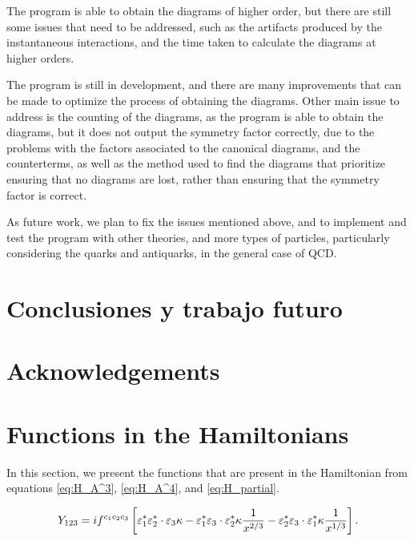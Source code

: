 \documentclass[11pt,a4paper,twoside,pdf]{article}
\numberwithin{equation}{section}
\begin{document}
The program is able to obtain the diagrams of higher order, but there are still
some issues that need to be addressed, such as the artifacts produced by the
instantaneous interactions, and the time taken to calculate the diagrams at higher
orders. 

The program is still in development, and there are many improvements that can
be made to optimize the process of obtaining the diagrams. Other main issue to 
address is the counting of the diagrams, as the program is able to obtain the diagrams, 
but it does not output the symmetry factor correctly, due to the problems with the factors 
associated to the canonical diagrams, and the counterterms, as well as the method
used to find the diagrams that prioritize ensuring that no diagrams are lost, rather than
ensuring that the symmetry factor is correct.

As future work, we plan to fix the issues mentioned above, and to implement and 
test the program with other theories, and more types of particles, particularly
considering the quarks and antiquarks, in the general case of QCD. 

\section{Conclusiones y trabajo futuro} \label{sec:conclusions_es}

\newpage
\section{Acknowledgements}



\newpage
\appendix

\section{Functions in the Hamiltonians} \label{sec:appendix_functions}
In this section, we present the functions that are present in the Hamiltonian from
equations \eqref{eq:H_A^3}, \eqref{eq:H_A^4}, and \eqref{eq:H_partial}.

\begin{equation}
    Y_{123} = i f^{c_1 c_2 c_3} \left[ \varepsilon^*_{1}\varepsilon^*_{2} \cdot
    \varepsilon_{3} \kappa-\varepsilon^*_{1}\varepsilon_{3} \cdot
    \varepsilon^*_{2}\kappa \frac{1}{x^{2/3}}-\varepsilon^*_{2}\varepsilon_{3} \cdot
    \varepsilon^*_{1}\kappa \frac{1}{x^{1/3}} \right].
\end{equation}

\newpage

\end{document}
